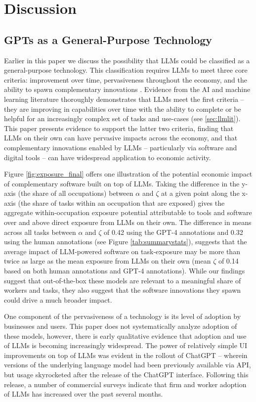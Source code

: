 \documentclass[11pt]{article}
\begin{document}
\section{Discussion}
\label{sec:discussion}

\subsection{GPTs as a General-Purpose Technology}

Earlier in this paper we discuss the possibility that LLMs could be classified as a general-purpose technology. This classification requires LLMs to meet three core criteria: improvement over time, pervasiveness throughout the economy, and the ability to spawn complementary innovations \citep{lipsey2005economic}. Evidence from the AI and machine learning literature thoroughly demonstrates that LLMs meet the first criteria -- they are improving in capabilities over time with the ability to complete or be helpful for an increasingly complex set of tasks and use-cases (see \ref{sec:llmlit}). This paper presents evidence to support the latter two criteria, finding that LLMs on their own can have pervasive impacts across the economy, and that complementary innovations enabled by LLMs -- particularly via software and digital tools -- can have widespread application to economic activity.

Figure \ref{fig:exposure_final} offers one illustration of the potential economic impact of complementary software built on top of LLMs. Taking the difference in the y-axis (the share of all occupations) between $\alpha$ and $\zeta$ at a given point along the x-axis (the share of tasks within an occupation that are exposed) gives the aggregate within-occupation exposure potential attributable to tools and software over and above direct exposure from LLMs on their own. The difference in means across all tasks between $\alpha$ and $\zeta$ of 0.42 using the GPT-4 annotations and 0.32 using the human annotations (see Figure \ref{tab:summarystats}), suggests that the average impact of LLM-powered software on task-exposure may be more than twice as large as the mean exposure from LLMs on their own (mean $\zeta$ of 0.14 based on both human annotations and GPT-4 annotations). While our findings suggest that out-of-the-box these models are relevant to a meaningful share of workers and tasks, they also suggest that the software innovations they spawn could drive a much broader impact.

One component of the pervasiveness of a technology is its level of adoption by businesses and users. This paper does not systematically analyze adoption of these models, however, there is early qualitative evidence that adoption and use of LLMs is becoming increasingly widespread. The power of relatively simple UI improvements on top of LLMs was evident in the rollout of ChatGPT -- wherein versions of the underlying language model had been previously available via API, but usage skyrocketed after the release of the ChatGPT interface. \citep{chow_chatgpt_2023, chatgptblog} Following this release, a number of commercial surveys indicate that firm and worker adoption of LLMs has increased over the past several months. \citep{constantz_bloomberg, resumebuildersuvey}
\end{document}
